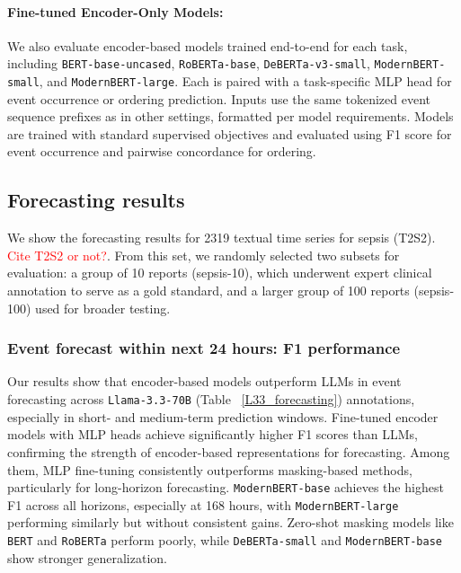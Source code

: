 \paragraph{Fine-tuned Encoder-Only Models:} We also evaluate encoder-based models trained end-to-end for each task, including \texttt{BERT-base-uncased}, \texttt{RoBERTa-base}, \texttt{DeBERTa-v3-small}, \texttt{ModernBERT-small}, and \texttt{ModernBERT-large}. Each is paired with a task-specific MLP head for event occurrence or ordering prediction. Inputs use the same tokenized event sequence prefixes as in other settings, formatted per model requirements. Models are trained with standard supervised objectives and evaluated using F1 score for event occurrence and pairwise concordance for ordering.


% 
%
% 
\subsection{Forecasting results}

We show the forecasting results for 2319 textual time series for sepsis (T2S2). \textcolor{red}{Cite T2S2 or not?}. From this set, we randomly selected two subsets for evaluation: a group of 10 reports (sepsis-10), which underwent expert clinical annotation to serve as a gold standard, and a larger group of 100 reports (sepsis-100) used for broader testing. 



\subsubsection{Event forecast within next 24 hours: F1 performance} Our results show that encoder-based models outperform LLMs in event forecasting across \texttt{Llama-3.3-70B} (Table ~\ref{L33_forecasting}) annotations, especially in short- and medium-term prediction windows. Fine-tuned encoder models with MLP heads achieve significantly higher F1 scores than LLMs, confirming the strength of encoder-based representations for forecasting. Among them, MLP fine-tuning consistently outperforms masking-based methods, particularly for long-horizon forecasting. \texttt{ModernBERT-base} achieves the highest F1 across all horizons, especially at 168 hours, with \texttt{ModernBERT-large} performing similarly but without consistent gains. Zero-shot masking models like \texttt{BERT} and \texttt{RoBERTa} perform poorly, while \texttt{DeBERTa-small} and \texttt{ModernBERT-base} show stronger generalization.

